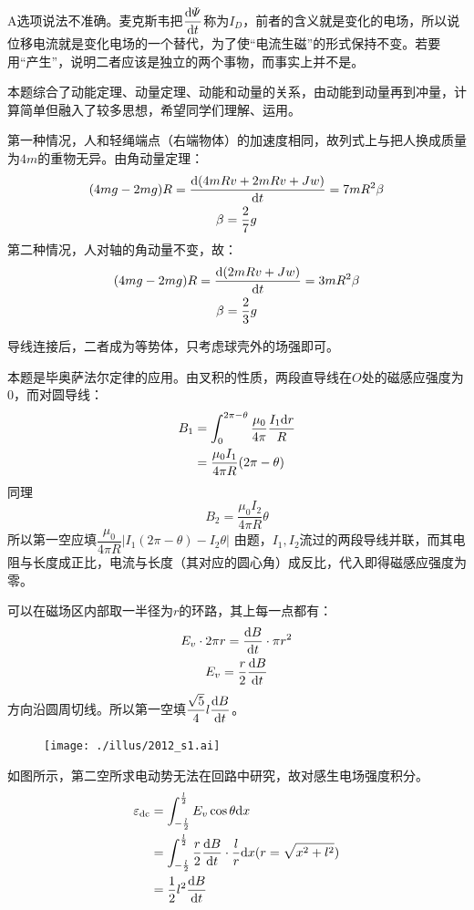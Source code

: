 
\note A选项说法不准确。麦克斯韦把$\dfrac{\mathrm{d}\varPsi}{\mathrm{d}t}$称为$I_D$，前者的含义就是变化的电场，所以说位移电流就是变化电场的一个替代，为了使“电流生磁”的形式保持不变。若要用“产生”，说明二者应该是独立的两个事物，而事实上并不是。


\tips 本题综合了动能定理、动量定理、动能和动量的关系，由动能到动量再到冲量，计算简单但融入了较多思想，希望同学们理解、运用。


\solve 第一种情况，人和轻绳端点（右端物体）的加速度相同，故列式上与把人换成质量为$4m$的重物无异。由角动量定理：
\begin{gather*}
	(4mg-2mg)R=\dfrac{\mathrm{d}(4mRv+2mRv+Jw)}{\mathrm{d}t}=7mR^2\beta\\
	\beta=\dfrac{2}{7}g
\end{gather*}
第二种情况，人对轴的角动量不变，故：
\begin{gather*}
(4mg-2mg)R=\dfrac{\mathrm{d}(2mRv+Jw)}{\mathrm{d}t}=3mR^2\beta\\
\beta=\dfrac{2}{3}g
\end{gather*}


\tips 导线连接后，二者成为等势体，只考虑球壳外的场强即可。


\solve 本题是毕奥萨法尔定律的应用。由叉积的性质，两段直导线在$O$处的磁感应强度为0，而对圆导线：
\begin{align*}
	B_1&=\int_{0}^{2\pi-\theta}\dfrac{\mu_0}{4\pi}\dfrac{I_1\mathrm{d}r}{R}\\
	&=\dfrac{\mu_0I_1}{4\pi R}(2\pi-\theta)
\end{align*}
同理
\[
	B_2=\dfrac{\mu_0I_2}{4\pi R}\theta
\]
所以第一空应填$\dfrac{\mu_0}{4\pi R}|I_1(2\pi-\theta)-I_2\theta|$
由题，$I_1,I_2$流过的两段导线并联，而其电阻与长度成正比，电流与长度（其对应的圆心角）成反比，代入即得磁感应强度为零。


\solve 可以在磁场区内部取一半径为$r$的环路，其上每一点都有：
\begin{gather*}
	E_v\cdot 2\pi r=\dfrac{\mathrm{d}B}{\mathrm{d}t}\cdot \pi r^2\\
	E_v=\dfrac{r}{2}\dfrac{\mathrm{d}B}{\mathrm{d}t}
\end{gather*}
方向沿圆周切线。所以第一空填$\dfrac{\sqrt{5}}{4}l\dfrac{\mathrm{d}B}{\mathrm{d}t}$。

\begin{figure}
	\centering
	\texttt{[image: ./illus/2012\_s1.ai]}
\end{figure}
如图所示，第二空所求电动势无法在回路中研究，故对感生电场强度积分。
\begin{align*}
	\varepsilon_{\textrm{dc}}&=\int_{-\frac{l}{2}}^{\frac{l}{2}}E_v\cos\theta\mathrm{d}x\\
	&=\int_{-\frac{l}{2}}^{\frac{l}{2}}\dfrac{r}{2}\dfrac{\mathrm{d}B}{\mathrm{d}t}\cdot\dfrac{l}{r}\mathrm{d}x(r=\sqrt{x^2+l^2})\\
	&=\dfrac{1}{2}l^2\dfrac{\mathrm{d}B}{\mathrm{d}t}
\end{align*}

